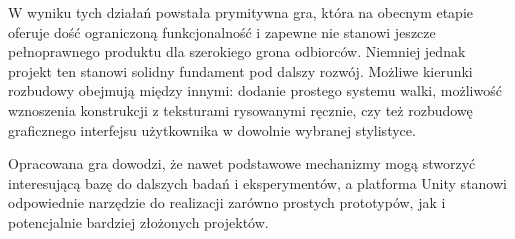 \documentclass[a4paper,12pt]{book} %
\begin{document}
W wyniku tych działań powstała prymitywna gra, która na obecnym etapie oferuje dość ograniczoną funkcjonalność i zapewne nie stanowi jeszcze pełnoprawnego produktu dla szerokiego grona odbiorców. Niemniej jednak projekt ten stanowi solidny fundament pod dalszy rozwój. Możliwe kierunki rozbudowy obejmują między innymi: dodanie prostego systemu walki, możliwość wznoszenia konstrukcji z teksturami rysowanymi ręcznie, czy też rozbudowę graficznego interfejsu użytkownika w dowolnie wybranej stylistyce.  

Opracowana gra dowodzi, że nawet podstawowe mechanizmy mogą stworzyć interesującą bazę do dalszych badań i eksperymentów, a platforma Unity stanowi odpowiednie narzędzie do realizacji zarówno prostych prototypów, jak i potencjalnie bardziej złożonych projektów.  
 
\lstlistoflistings
{}

\listoffigures{} 
\end{document}
